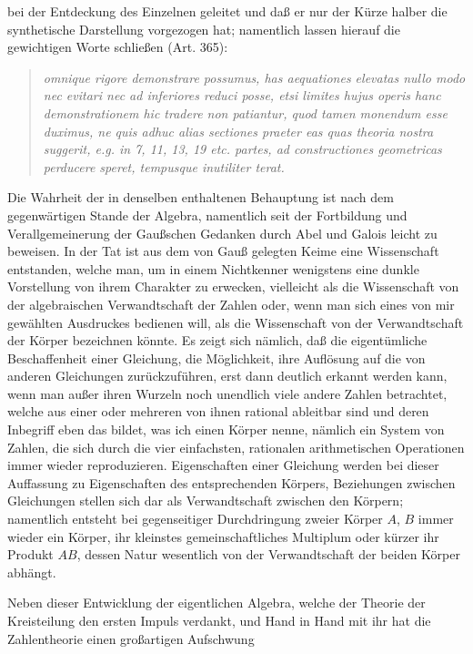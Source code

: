 \documentclass[11pt]{article}
\newcommand{\origpage}[1]{\par\vspace{0.25em}\noindent{\footnotesize\itshape [Gedruckte Seite #1]}\par\vspace{0.25em}}
\begin{document}
\origpage{409}
bei der Entdeckung des Einzelnen geleitet und daß er nur der Kürze halber die synthetische Darstellung vorgezogen hat; namentlich lassen hierauf die gewichtigen Worte schließen (Art. 365):
\begin{quote}\itshape
omnique rigore demonstrare possumus, has aequationes elevatas nullo modo nec evitari nec ad inferiores reduci posse, etsi limites hujus operis hanc demonstrationem hic tradere non patiantur, quod tamen monendum esse duximus, ne quis adhuc alias sectiones praeter eas quas theoria nostra suggerit, e.g. in 7, 11, 13, 19 etc. partes, ad constructiones geometricas perducere speret, tempusque inutiliter terat.
\end{quote}
Die Wahrheit der in denselben enthaltenen Behauptung ist nach dem gegenwärtigen Stande der Algebra, namentlich seit der Fortbildung und Verallgemeinerung der Gaußschen Gedanken durch Abel und Galois leicht zu beweisen. In der Tat ist aus dem von Gauß gelegten Keime eine Wissenschaft entstanden, welche man, um in einem Nichtkenner wenigstens eine dunkle Vorstellung von ihrem Charakter zu erwecken, vielleicht als die Wissenschaft von der algebraischen Verwandtschaft der Zahlen oder, wenn man sich eines von mir gewählten Ausdruckes bedienen will, als die Wissenschaft von der Verwandtschaft der Körper bezeichnen könnte. Es zeigt sich nämlich, daß die eigentümliche Beschaffenheit einer Gleichung, die Möglichkeit, ihre Auflösung auf die von anderen Gleichungen zurückzuführen, erst dann deutlich erkannt werden kann, wenn man außer ihren Wurzeln noch unendlich viele andere Zahlen betrachtet, welche aus einer oder mehreren von ihnen rational ableitbar sind und deren Inbegriff eben das bildet, was ich einen Körper nenne, nämlich ein System von Zahlen, die sich durch die vier einfachsten, rationalen arithmetischen Operationen immer wieder reproduzieren. Eigenschaften einer Gleichung werden bei dieser Auffassung zu Eigenschaften des entsprechenden Körpers, Beziehungen zwischen Gleichungen stellen sich dar als Verwandtschaft zwischen den Körpern; namentlich entsteht bei gegenseitiger Durchdringung zweier Körper $A$, $B$ immer wieder ein Körper, ihr kleinstes gemeinschaftliches Multiplum oder kürzer ihr Produkt $AB$, dessen Natur wesentlich von der Verwandtschaft der beiden Körper abhängt.

Neben dieser Entwicklung der eigentlichen Algebra, welche der Theorie der Kreisteilung den ersten Impuls verdankt, und Hand in Hand mit ihr hat die Zahlentheorie einen großartigen Aufschwung
\end{document}
